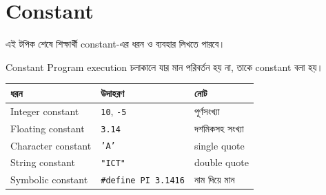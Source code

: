 \section{Constant}

\begin{learningbox}
এই টপিক শেষে শিক্ষার্থী constant-এর ধরন ও ব্যবহার লিখতে পারবে।
\end{learningbox}

\begin{definitionbox}{Constant}
Program execution চলাকালে যার মান পরিবর্তন হয় না, তাকে constant বলা হয়।
\end{definitionbox}

\begin{center}
\begin{tabular}{|p{}|p{}|p{}|}
\hline
\textbf{ধরন} & \textbf{উদাহরণ} & \textbf{নোট} \\
\hline
Integer constant & \texttt{10}, \texttt{-5} & পূর্ণসংখ্যা \\
\hline
Floating constant & \texttt{3.14} & দশমিকসহ সংখ্যা \\
\hline
Character constant & \texttt{'A'} & single quote \\
\hline
String constant & \texttt{"ICT"} & double quote \\
\hline
Symbolic constant & \texttt{\#define PI 3.1416} & নাম দিয়ে মান \\
\hline
\end{tabular}
\end{center}
